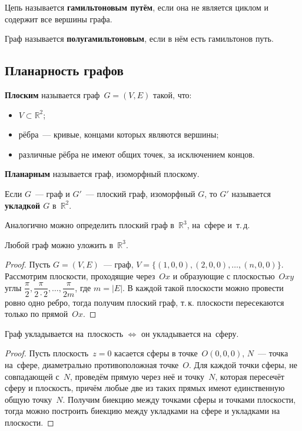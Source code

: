 Цепь называется \textbf{гамильтоновым путём}, если она не является циклом и содержит все вершины графа.

 Граф называется \textbf{полугамильтоновым}, если в нём есть гамильтонов путь.

\subsection{Планарность графов}
 \textbf{Плоским} называется граф~$G = (V, E)$ такой, что:
\begin{itemize}
	\item $V \subset \mathbb R^2$;
	\item рёбра~--- кривые, концами которых являются вершины;
	\item различные рёбра не имеют общих точек, за исключением концов.
\end{itemize}

 \textbf{Планарным} называется граф, изоморфный плоскому.

Если $G$~--- граф и $G'$~--- плоский граф, изоморфный $G$, то $G'$ называется \textbf{укладкой $G$} в~$\mathbb R^2$.

Аналогично можно определить плоский граф в~$\mathbb R^3$, на~сфере и~т.\,д.

\begin{theorem}
Любой граф можно уложить в~$\mathbb R^3$.
\end{theorem}
\begin{proof}
Пусть $G = (V, E)$~--- граф, $V = \{ (1, 0, 0), (2, 0, 0), \ldots, (n, 0, 0) \}$.
Рассмотрим плоскости, проходящие через~$Ox$ и образующие с плоскостью~$Oxy$ углы
$\dfrac\pi2, \dfrac\pi{2\cdot2}, \ldots, \dfrac\pi{2m}$, где $m = |E|$.
В каждой такой плоскости можно провести ровно одно ребро, тогда получим плоский граф, т.\,к. плоскости пересекаются только по прямой~$Ox$.
\end{proof}

\begin{theorem}
Граф укладывается на~плоскость $\Leftrightarrow$ он укладывается на~сферу.
\end{theorem}
\begin{proof}
Пусть плоскость~$z = 0$ касается сферы в точке~$O(0, 0, 0)$, $N$~--- точка на~сфере, диаметрально противоположная точке~$O$.
Для каждой точки сферы, не совпадающей с~$N$, проведём прямую через неё и точку~$N$, которая пересечёт сферу и плоскость, причём любые две из таких прямых имеют единственную общую точку~$N$.
Получим биекцию между точками сферы и точками плоскости, тогда можно построить биекцию между укладками на сфере и укладками на плоскости.
\end{proof}

